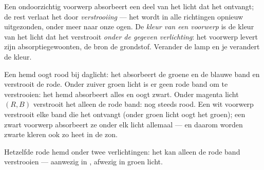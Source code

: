 \begin{definition}\label{def:g11:color-light-sources:objectcolor}
Een ondoorzichtig voorwerp absorbeert een deel van het licht dat het
ontvangt; de rest verlaat het door \emph{verstrooiing}
--- het wordt in alle richtingen opnieuw uitgezonden, onder meer naar
onze ogen. De \emph{kleur van een voorwerp}
is de kleur van het licht dat het verstrooit \emph{onder de gegeven
verlichting}: het voorwerp levert zijn absorptiegewoonten, de bron de
grondstof. Verander de lamp en je verandert de kleur.
\end{definition}

\begin{example}\label{ex:g11:color-light-sources:redshirt}
Een hemd oogt rood bij daglicht: het absorbeert de groene en de blauwe
band en verstrooit de rode. Onder zuiver groen licht is er geen rode band
om te verstrooien: het hemd absorbeert alles en oogt zwart. Onder
magenta licht $(R, B)$ verstrooit het alleen de rode band: nog steeds
rood. Een wit voorwerp verstrooit elke band die het ontvangt (onder groen
licht oogt het groen); een zwart voorwerp absorbeert ze onder elk licht
allemaal --- en daarom worden zwarte kleren ook zo heet in de zon.
\end{example}

\begin{omfigure}
\qquad
{}

{\small Hetzelfde rode hemd onder twee verlichtingen: het kan alleen de
rode band verstrooien --- aanwezig in , afwezig in groen licht.}
\end{omfigure}

